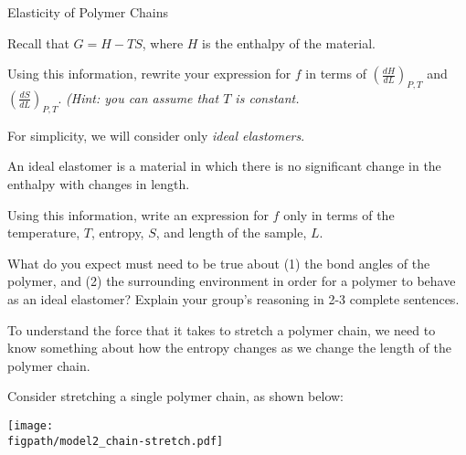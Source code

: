 \begin{activity}{Elasticity of Polymer Chains}
\begin{ctqs}
	\question Recall that $G = H - TS$, where $H$ is the enthalpy of the material.  
	
		Using this information, rewrite your expression for $f$ in terms of $\left(\frac{dH}{dL}\right)_{P,T}$ and $\left(\frac{dS}{dL}\right)_{P,T}$.  \emph{(Hint: you can assume that $T$ is constant.}
		
		\begin{solution}[1.5in]
		\end{solution}
		
		\label{\labelbase:ctq:fdSdL}
	
\end{ctqs}

\begin{infobox}
	
	For simplicity, we will consider only \emph{ideal elastomers}.
	
	An ideal elastomer is a material in which there is no significant change in the enthalpy with changes in length.
	
\end{infobox}

\begin{ctqs}

	\question Using this information, write an expression for $f$ only in terms of the temperature, $T$, entropy, $S$, and length of the sample, $L$.
		
		\begin{solution}[1in]
		\end{solution}
	
	\question What do you expect must need to be true about (1) the bond angles of the polymer, and (2) the surrounding environment in order for a polymer to behave as an ideal elastomer?  Explain your group's reasoning in 2-3 complete sentences.
		
		\begin{solution}[2in]
		\end{solution}

\end{ctqs}

\begin{model}
	To understand the force that it takes to stretch a polymer chain, we need to know something about how the entropy changes as we change the length of the polymer chain.
	
	Consider stretching a single polymer chain, as shown below:
	
	\vspace{6pt}
	\centerline{\texttt{[image: \\figpath/model2\_chain-stretch.pdf]}}
\end{model}


\end{activity}
